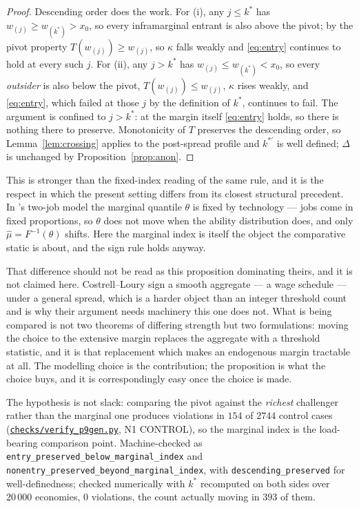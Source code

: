 \documentclass[11pt]{article}
\newcommand{\file}[1]{\href{run:#1}{\texttt{#1}}}
\begin{document}
\begin{proof}
Descending order does the work. For (i), any $j\le k^*$ has $w_{(j)}\ge
w_{(k^*)}>x_0$, so every inframarginal entrant is also above the pivot; by
the pivot property $T(w_{(j)})\ge w_{(j)}$, so $\kappa$ falls weakly and
\eqref{eq:entry} continues to hold at every such $j$. For (ii), any $j>k^*$
has $w_{(j)}\le w_{(k^*)}<x_0$, so every \emph{outsider} is also below the
pivot, $T(w_{(j)})\le w_{(j)}$, $\kappa$ rises weakly, and \eqref{eq:entry},
which failed at those $j$ by the definition of $k^*$, continues to fail. The
argument is confined to $j>k^*$: at the margin itself \eqref{eq:entry} holds,
so there is nothing there to preserve. Monotonicity of $T$ preserves the
descending order, so Lemma~\ref{lem:crossing} applies to the post-spread
profile and $k^{*\prime}$ is well defined; $\Delta$ is unchanged by
Proposition~\ref{prop:anon}.
\end{proof}

This is stronger than the fixed-index reading of the same rule, and it is the
respect in which the present setting differs from its closest structural
precedent. In \citet{CostrellLoury2004}'s two-job model the marginal quantile
$\theta$ is fixed by technology --- jobs come in fixed proportions, so
$\theta$ does not move when the ability distribution does, and only
$\hat\mu=F^{-1}(\theta)$ shifts. Here the marginal index is itself the object
the comparative static is about, and the sign rule holds anyway.

That difference should not be read as this proposition dominating theirs, and
it is not claimed here. Costrell--Loury sign a smooth aggregate --- a wage
schedule --- under a general spread, which is a harder object than an integer
threshold count and is why their argument needs machinery this one does not.
What is being compared is not two theorems of differing strength but two
formulations: moving the choice to the extensive margin replaces the
aggregate with a threshold statistic, and it is that replacement which makes
an endogenous margin tractable at all. The modelling choice is the
contribution; the proposition is what the choice buys, and it is
correspondingly easy once the choice is made.

The hypothesis is not slack: comparing the pivot against the \emph{richest}
challenger rather than the marginal one produces violations in $154$ of
$2744$ control cases (\file{checks/verify\_p9gen.py}, N1 CONTROL), so the
marginal index is the load-bearing comparison point. Machine-checked as
\texttt{entry\_preserved\_below\_marginal\_index} and
\texttt{nonentry\_preserved\_beyond\_marginal\_index}, with
\texttt{descending\_preserved} for well-definedness; checked numerically with
$k^*$ recomputed on both sides over $20\,000$ economies, $0$ violations, the
count actually moving in $393$ of them.
\end{document}
